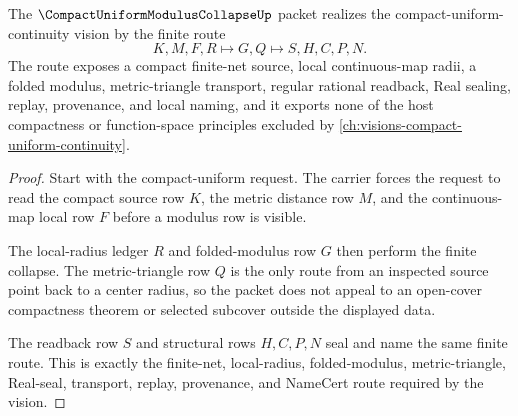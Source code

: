 \begin{theorem}
\label{thm:compact-uniform-modulus-collapse-vision-readback}
The $\CompactUniformModulusCollapseUp$ packet realizes the compact-uniform-continuity vision by the finite route
$$
K,M,F,R \longmapsto G,Q \longmapsto S,H,C,P,N .
$$
The route exposes a compact finite-net source, local continuous-map radii, a folded modulus, metric-triangle transport, regular rational readback, Real sealing, replay, provenance, and local naming, and it exports none of the host compactness or function-space principles excluded by \autoref{ch:visions-compact-uniform-continuity}.
\end{theorem}
\begin{proof}
Start with the compact-uniform request. The carrier forces the request to read the compact source row $K$, the metric distance row $M$, and the continuous-map local row $F$ before a modulus row is visible.

The local-radius ledger $R$ and folded-modulus row $G$ then perform the finite collapse. The metric-triangle row $Q$ is the only route from an inspected source point back to a center radius, so the packet does not appeal to an open-cover compactness theorem or selected subcover outside the displayed data.

The readback row $S$ and structural rows $H,C,P,N$ seal and name the same finite route. This is exactly the finite-net, local-radius, folded-modulus, metric-triangle, Real-seal, transport, replay, provenance, and NameCert route required by the vision.
\end{proof}



